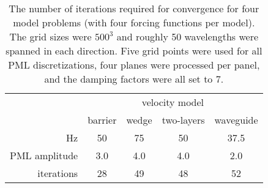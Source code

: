 \begin{table}
\small
\centering
\begin{tabular}{r|c|c|c|c|}
\cline{2-5}
 & \multicolumn{4}{|c|}{velocity model} \\
\cline{2-5}
  & barrier & wedge & two-layers & waveguide  \\
\hline
\multicolumn{1}{|r|}{Hz}
  & 50 & 75 & 50 & 37.5 \\
\hline
\multicolumn{1}{|r|}{PML amplitude}
  & 3.0 & 4.0 & 4.0 & 2.0 \\
\hline
\multicolumn{1}{|r|}{iterations}
  & 28 & 49 & 48 & 52 \\
\hline
\end{tabular}
\caption{The number of iterations required for convergence for four model 
problems (with four forcing functions per model).
The grid sizes were $500^3$ and roughly 50 wavelengths were spanned in each 
direction. Five grid points were used for all PML discretizations, 
four planes were processed per panel, and the damping factors were all set to 
$7$.}
\label{tbl:convergence}
\end{table}
